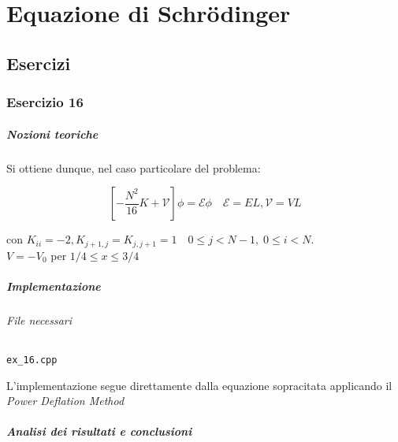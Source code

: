 \setchapterpreamble[u]{\margintoc}
\chapter{Equazione di Schrödinger}

\section{Esercizi}

\subsection{Esercizio 16}

\paragraph{Nozioni teoriche}


Si ottiene dunque, nel caso particolare del problema:

\[
	\left[-\frac{N^2}{16}K+\mathcal{V}\right]\phi = \mathcal{E} \phi \quad \mathcal{E} = EL, \mathcal{V} = VL
\]

con $K_{ii} = -2, K_{j+1,j}=K_{j,j+1}=1 \quad 0 \leq j < N-1, \; 0 \leq i < N$. \\$V= -V_0$ per $1/4 \leq x \leq 3/4$


\paragraph{Implementazione}

\label{file}
\subparagraph{File necessari} \texttt{ex\_16.cpp}

L'implementazione segue direttamente dalla equazione sopracitata applicando il \textit{Power Deflation Method}

\paragraph{Analisi dei risultati e conclusioni}

